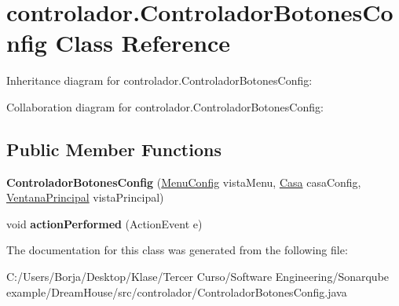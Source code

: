 \hypertarget{classcontrolador_1_1_controlador_botones_config}{}\section{controlador.\+Controlador\+Botones\+Config Class Reference}
\label{classcontrolador_1_1_controlador_botones_config}


Inheritance diagram for controlador.\+Controlador\+Botones\+Config\+:


Collaboration diagram for controlador.\+Controlador\+Botones\+Config\+:
\subsection*{Public Member Functions}
\begin{DoxyCompactItemize}
\item 
\mbox{\label{classcontrolador_1_1_controlador_botones_config_a4af8c80c8585506639754cfb7f77eb61}} 
{\bfseries Controlador\+Botones\+Config} (\mbox{\hyperlink{classvista_1_1_menu_config}{Menu\+Config}} vista\+Menu, \mbox{\hyperlink{classmodelo_1_1_casa}{Casa}} casa\+Config, \mbox{\hyperlink{classvista_1_1_ventana_principal}{Ventana\+Principal}} vista\+Principal)
\item 
\mbox{\label{classcontrolador_1_1_controlador_botones_config_a2cd5a386f11405de4564bc37e1f21850}} 
void {\bfseries action\+Performed} (Action\+Event e)
\end{DoxyCompactItemize}


The documentation for this class was generated from the following file\+:\begin{DoxyCompactItemize}
\item 
C\+:/\+Users/\+Borja/\+Desktop/\+Klase/\+Tercer Curso/\+Software Engineering/\+Sonarqube example/\+Dream\+House/src/controlador/Controlador\+Botones\+Config.\+java\end{DoxyCompactItemize}

